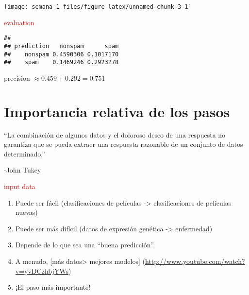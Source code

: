 \documentclass[
]{article}
\newenvironment{Shaded}{\begin{snugshade}}{\end{snugshade}}
\newcommand{\FloatTok}[1]{\textcolor[rgb]{0.00,0.00,0.81}{#1}}
\newcommand{\FunctionTok}[1]{\textcolor[rgb]{0.00,0.00,0.00}{#1}}
\newcommand{\NormalTok}[1]{#1}
\newcommand{\OtherTok}[1]{\textcolor[rgb]{0.56,0.35,0.01}{#1}}
\newcommand{\SpecialCharTok}[1]{\textcolor[rgb]{0.00,0.00,0.00}{#1}}
\newcommand{\StringTok}[1]{\textcolor[rgb]{0.31,0.60,0.02}{#1}}
\providecommand{\tightlist}{%
  \setlength{\itemsep}{0pt}\setlength{\parskip}{0pt}}
\begin{document}
\begin{center}\texttt{[image: semana\_1\_files/figure-latex/unnamed-chunk-3-1]} \end{center}

\textcolor{red}{evaluation }

\begin{Shaded}
\end{Shaded}

\begin{verbatim}
##           
## prediction   nonspam      spam
##    nonspam 0.4590306 0.1017170
##    spam    0.1469246 0.2923278
\end{verbatim}

precision \(\approx 0.459 + 0.292 = 0.751\)

\hypertarget{importancia-relativa-de-los-pasos}{%
\section{Importancia relativa de los
pasos}\label{importancia-relativa-de-los-pasos}}

``La combinación de algunos datos y el doloroso deseo de una respuesta
no garantiza que se pueda extraer una respuesta razonable de un conjunto
de datos determinado.''

-John Tukey

\textcolor{red}{input data}

\begin{enumerate}
\def\labelenumi{\arabic{enumi}.}
\tightlist
\item
  Puede ser fácil (clasificaciones de películas -\textgreater{}
  clasificaciones de películas nuevas)
\item
  Puede ser más difícil (datos de expresión genética -\textgreater{}
  enfermedad)
\item
  Depende de lo que sea una ``buena predicción''.
\item
  A menudo, {[}más datos\textgreater{} mejores modelos{]}
  (\url{http://www.youtube.com/watch?v=yvDCzhbjYWs})
\item
  ¡El paso más importante!
\end{enumerate}
\end{document}
